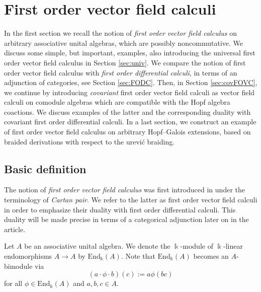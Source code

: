 \documentclass{article}
\theoremstyle{definition}
\begin{document}
	\section{First order vector field calculi}\label{sec:FOVC}
	
	In the first section we recall the notion of {\sl first order vector field calculus} on arbitrary associative unital algebras, which are possibly noncommutative. We discuss some simple, but important, examples, also introducing the universal first order vector field calculus in Section \ref{sec:univ}. We compare the notion of first order vector field calculus with {\sl first order differential calculi}, in terms of an adjunction of categories, see Section \ref{sec:FODC}. Then, in Section \ref{sec:covFOVC}, we continue by introducing \emph{covariant} first order vector field calculi as vector field calculi on comodule algebras which are compatible with the Hopf algebra coactions. We discuss examples of the latter and the corresponding duality with covariant first order differential calculi. In a last section, we construct an example of first order vector field calculus on arbitrary Hopf--Galois extensions, based on braided derivations with respect to the \DJ ur\dj evi\'c braiding.
	
	\subsection{Basic definition}
	
	The notion of {\sl first order vector field calculus} was first introduced in \cite{Bor96,Bor97} under the terminology of {\sl Cartan pair}. We refer to the latter as first order vector field calculi in order to emphasize their duality with first order differential calculi. This duality will be made precise in terms of a categorical adjunction later on in the article.
	
	Let $A$ be an associative unital algebra. We denote the $\Bbbk$-module of $\Bbbk$-linear endomorphisms $A\to A$ by $\mathrm{End}_\Bbbk(A)$. Note that $\mathrm{End}_\Bbbk(A)$ becomes an $A$-bimodule via
	\begin{equation*}
		(a\cdot\phi\cdot b)(c):=a\phi(bc)
	\end{equation*}
	for all $\phi\in\mathrm{End}_\Bbbk(A)$ and $a,b,c\in A$.
	
\end{document}
